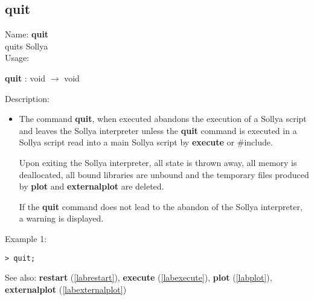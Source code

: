 \subsection{quit}
\label{labquit}
\noindent Name: \textbf{quit}\\
quits Sollya\\

\noindent Usage: 
\begin{center}
\textbf{quit} : \textsf{void} $\rightarrow$ \textsf{void}\\
\end{center}
\noindent Description: \begin{itemize}

\item The command \textbf{quit}, when executed abandons the execution of a Sollya
   script and leaves the Sollya interpreter unless the \textbf{quit} command 
   is executed in a Sollya script read into a main Sollya script by
   \textbf{execute} or $\#$include.
    
   Upon exiting the Sollya interpreter, all state is thrown away, all
   memory is deallocated, all bound libraries are unbound and the
   temporary files produced by \textbf{plot} and \textbf{externalplot} are deleted.
    
   If the \textbf{quit} command does not lead to the abandon of the Sollya
   interpreter, a warning is displayed.
\end{itemize}
\noindent Example 1: 
\begin{center}\begin{minipage}{15cm}\begin{Verbatim}[frame=single]
> quit;
\end{Verbatim}
\end{minipage}\end{center}
See also: \textbf{restart} (\ref{labrestart}), \textbf{execute} (\ref{labexecute}), \textbf{plot} (\ref{labplot}), \textbf{externalplot} (\ref{labexternalplot})

